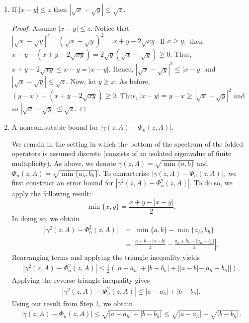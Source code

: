\documentclass[12pt,a4paper]{article}
\theoremstyle{boldthm}
\theoremstyle{bolddefn}
\begin{document}
\begin{enumerate}[label=\textbf{Step \arabic*}]
    \item If $|x-y| \le z$ then $|\sqrt x - \sqrt y | \le \sqrt z.$

    \begin{proof}
        Assume $|x-y| \le z.$ Notice that $|\sqrt x - \sqrt y |^2 = (\sqrt x - \sqrt y )^2 = x + y - 2 \sqrt{xy}.$ If $x \ge y,$ then $x-y - (x+y-2\sqrt{xy}) = 2 \sqrt y (\sqrt x - \sqrt y) \ge 0.$ Thus, $x + y - 2\sqrt{xy} \le x - y = |x-y|.$ Hence, $|\sqrt x - \sqrt y|^2 \le  |x-y|$ and  $|\sqrt x - \sqrt y| \le  \sqrt z.$ Now, let $y \ge x.$ As before, $(y-x) - (x+y-2\sqrt{xy}) \ge 0.$ Thus, $|x-y| = y-x \ge |\sqrt x - \sqrt y|^2$ and so $|\sqrt x - \sqrt y| \le \sqrt z.$
    \end{proof}
    


    
    \item A noncomputable bound for $|\gamma(z, A) - \Phi_n(z, A)|.$

    We remain in the setting in which the bottom of the spectrum of the folded operators is assumed discrete (consists of an isolated eigenvalue of finite multiplicity). As above, we denote $\gamma(z, A) = \sqrt{\min\{a, b\}}$ and $\Phi_n(z, A) = \sqrt{\min\{a_h, b_h \}}.$ To characterize $|\gamma(z, A) - \Phi_n(z, A)|,$ we first construct an error bound for $|\gamma^2(z, A) - \Phi_n^2(z, A)|.$ To do so, we apply the following result:
    \begin{equation}
        \min\{x, y\} = \frac{x + y - |x-y|}{2}.
    \end{equation}
    In doing so, we obtain
    \begin{align}
        | \gamma^2(z, A) - \Phi_n^2(z, A) | &= | \min\{a, b\} - \min\{a_h, b_h\} |\\
        &= \left| \frac{a + b - |a-b|}{2} - \frac{a_h + b_h - |a_h-b_h|}{2}\right|.
    \end{align}
    Rearranging terms and applying the triangle inequality yields
        \begin{align}
        | \gamma^2(z, A) - \Phi_n^2(z, A) | \le \frac{1}{2} \left( |a-a_h| + |b-b_h| + ||a - b| - |a_h - b_h||\right).
    \end{align}
    Applying the reverse triangle inequality gives
    \begin{align}
        | \gamma^2(z, A) - \Phi_n^2(z, A) | \le |a-a_h| + |b-b_h|.
    \end{align}
    Using our result from Step 1, we obtain
        \begin{align}
        | \gamma(z, A) - \Phi_n(z, A) | \le \sqrt{|a-a_h| + |b-b_h|} \le \sqrt{|a-a_h|} + \sqrt{|b-b_h|}.
    \end{align}
    

\end{enumerate}
\end{document}
